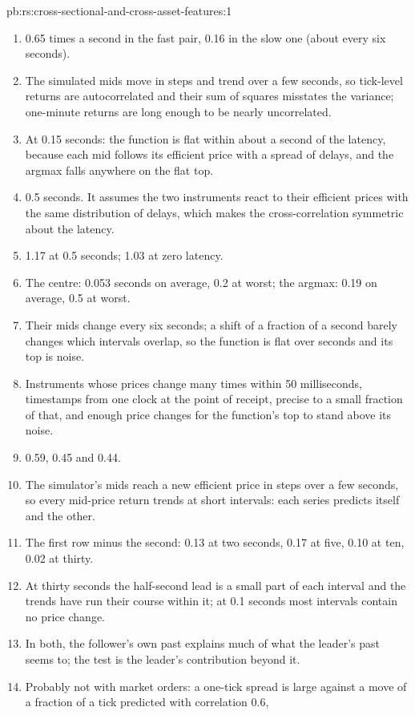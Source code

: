 \begin{solution}{pb:rs:cross-sectional-and-cross-asset-features:1}
\begin{enumerate}
\item 0.65 times a second in the fast pair, 0.16 in the slow one (about every six seconds).
\item The simulated mids move in steps and trend over a few seconds, so tick-level returns are autocorrelated and their sum of squares
misstates the variance; one-minute returns are long enough to be nearly uncorrelated.
\item At 0.15 seconds: the function is flat within about a second of the latency, because each mid follows its efficient price with a
spread of delays, and the argmax falls anywhere on the flat top.
\item 0.5 seconds. It assumes the two instruments react to their efficient prices with the same distribution of delays, which makes the
cross-correlation symmetric about the latency.
\item 1.17 at 0.5 seconds; 1.03 at zero latency.
\item The centre: 0.053 seconds on average, 0.2 at worst; the argmax: 0.19 on average, 0.5 at worst.
\item Their mids change every six seconds; a shift of a fraction of a second barely changes which intervals overlap, so the function is
flat over seconds and its top is noise.
\item Instruments whose prices change many times within 50 milliseconds, timestamps from one clock at the point of receipt, precise to a
small fraction of that, and enough price changes for the function's top to stand above its noise.
\item 0.59, 0.45 and 0.44.
\item The simulator's mids reach a new efficient price in steps over a few seconds, so every mid-price return trends at short intervals:
each series predicts itself and the other.
\item The first row minus the second: 0.13 at two seconds, 0.17 at five, 0.10 at ten, 0.02 at thirty.
\item At thirty seconds the half-second lead is a small part of each interval and the trends have run their course within it; at 0.1
seconds most intervals contain no price change.
\item In both, the follower's own past explains much of what the leader's past seems to; the test is the leader's contribution beyond it.
\item Probably not with market orders: a one-tick spread is large against a move of a fraction of a tick predicted with correlation 0.6,

\end{enumerate}
\end{solution}

